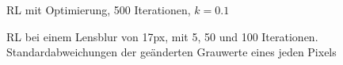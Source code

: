 \documentclass[a4paper,12pt]{article}
\begin{document}
\begin{figure}[h]
\caption{RL mit Optimierung, 500 Iterationen, $k = 0.1$}%
\label{figure_konv_k0_1}
\end{figure}



\begin{figure}[htbp]
\caption{RL bei einem Lensblur von 17px, mit 5, 50 und 100 Iterationen.
Standardabweichungen der geänderten Grauwerte eines jeden Pixels}%
\label{figure_konv_histogramm}
\end{figure}
\end{document}
